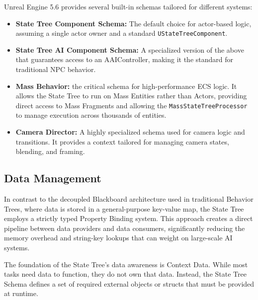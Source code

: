Unreal Engine 5.6 provides several built-in schemas tailored for different systems:

\begin{itemize}
    \item \textbf{State Tree Component Schema:} The default choice for actor-based logic, assuming a single actor owner and a standard \texttt{UStateTreeComponent}.
    \item \textbf{State Tree AI Component Schema:} A specialized version of the above that guarantees access to an AAIController, making it the standard for traditional NPC behavior.
    \item \textbf{Mass Behavior:} the critical schema for high-performance ECS logic. It allows the State Tree to run on Mass Entities rather than Actors, providing direct access to Mass Fragments and allowing the \texttt{MassStateTreeProcessor} to manage execution across thousands of entities.
    \item \textbf{Camera Director:} A highly specialized schema used for camera logic and transitions. It provides a context tailored for managing camera states, blending, and framing.
\end{itemize}

\subsection{Data Management}

In contrast to the decoupled Blackboard architecture used in traditional Behavior Trees, where data is stored in a general-purpose key-value map, the State Tree employs a strictly typed Property Binding system. This approach creates a direct pipeline between data providers and data consumers, significantly reducing the memory overhead and string-key lookups that can weight on large-scale AI systems.

The foundation of the State Tree’s data awareness is Context Data. While most tasks need data to function, they do not own that data. Instead, the State Tree Schema defines a set of required external objects or structs that must be provided at runtime.


